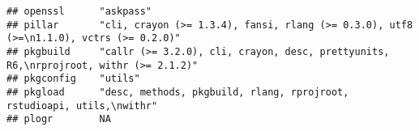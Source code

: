 \documentclass[]{book}
\begin{document}
\begin{verbatim}
## openssl      "askpass"                                                                                                                                                                                                                                                                                                                                                                                                                                                                                                   
## pillar       "cli, crayon (>= 1.3.4), fansi, rlang (>= 0.3.0), utf8 (>=\n1.1.0), vctrs (>= 0.2.0)"                                                                                                                                                                                                                                                                                                                                                                                                                       
## pkgbuild     "callr (>= 3.2.0), cli, crayon, desc, prettyunits, R6,\nrprojroot, withr (>= 2.1.2)"                                                                                                                                                                                                                                                                                                                                                                                                                        
## pkgconfig    "utils"                                                                                                                                                                                                                                                                                                                                                                                                                                                                                                     
## pkgload      "desc, methods, pkgbuild, rlang, rprojroot, rstudioapi, utils,\nwithr"                                                                                                                                                                                                                                                                                                                                                                                                                                      
## plogr        NA                                                                                                                                                                                                                                                                                                                                                                                                                                                                                                          

\end{verbatim}
\end{document}
